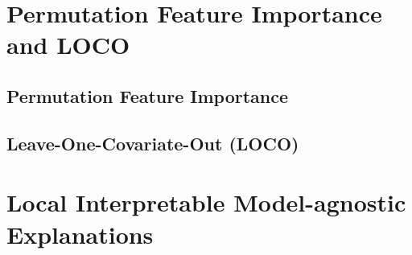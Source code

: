 \documentclass[]{krantz}
\begin{document}
\chapter{Permutation Feature Importance and
LOCO}\label{permutation-feature-importance-and-loco}

\section{Permutation Feature
Importance}\label{permutation-feature-importance}

\section{Leave-One-Covariate-Out
(LOCO)}\label{leave-one-covariate-out-loco}

\chapter{Local Interpretable Model-agnostic
Explanations}\label{local-interpretable-model-agnostic-explanations}



\backmatter
\printindex
\end{document}
